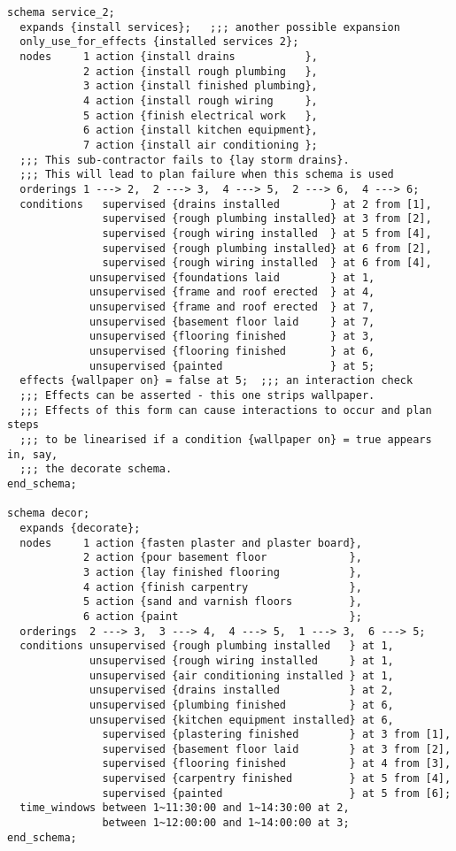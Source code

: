 \begin{verbatim}
schema service_2;
  expands {install services};   ;;; another possible expansion
  only_use_for_effects {installed services 2};
  nodes     1 action {install drains           },
            2 action {install rough plumbing   },
            3 action {install finished plumbing},
            4 action {install rough wiring     },
            5 action {finish electrical work   },
            6 action {install kitchen equipment},
            7 action {install air conditioning };
  ;;; This sub-contractor fails to {lay storm drains}.
  ;;; This will lead to plan failure when this schema is used
  orderings 1 ---> 2,  2 ---> 3,  4 ---> 5,  2 ---> 6,  4 ---> 6;
  conditions   supervised {drains installed        } at 2 from [1],
               supervised {rough plumbing installed} at 3 from [2],
               supervised {rough wiring installed  } at 5 from [4],
               supervised {rough plumbing installed} at 6 from [2],
               supervised {rough wiring installed  } at 6 from [4],
             unsupervised {foundations laid        } at 1,
             unsupervised {frame and roof erected  } at 4,
             unsupervised {frame and roof erected  } at 7,
             unsupervised {basement floor laid     } at 7,
             unsupervised {flooring finished       } at 3,
             unsupervised {flooring finished       } at 6,
             unsupervised {painted                 } at 5;
  effects {wallpaper on} = false at 5;  ;;; an interaction check
  ;;; Effects can be asserted - this one strips wallpaper.
  ;;; Effects of this form can cause interactions to occur and plan steps
  ;;; to be linearised if a condition {wallpaper on} = true appears in, say,
  ;;; the decorate schema.
end_schema;
           
schema decor;
  expands {decorate};
  nodes     1 action {fasten plaster and plaster board},
            2 action {pour basement floor             },
            3 action {lay finished flooring           },
            4 action {finish carpentry                },
            5 action {sand and varnish floors         },
            6 action {paint                           };
  orderings  2 ---> 3,  3 ---> 4,  4 ---> 5,  1 ---> 3,  6 ---> 5;
  conditions unsupervised {rough plumbing installed   } at 1,
             unsupervised {rough wiring installed     } at 1,
             unsupervised {air conditioning installed } at 1,
             unsupervised {drains installed           } at 2,
             unsupervised {plumbing finished          } at 6,
             unsupervised {kitchen equipment installed} at 6,
               supervised {plastering finished        } at 3 from [1],
               supervised {basement floor laid        } at 3 from [2],
               supervised {flooring finished          } at 4 from [3],
               supervised {carpentry finished         } at 5 from [4],
               supervised {painted                    } at 5 from [6];
  time_windows between 1~11:30:00 and 1~14:30:00 at 2,
               between 1~12:00:00 and 1~14:00:00 at 3;
end_schema;


\end{verbatim}
